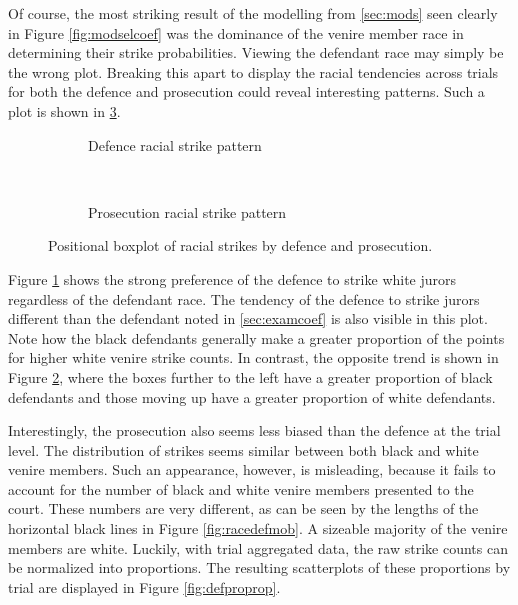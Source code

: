 Of course, the most striking result of the modelling from \ref{sec:mods} seen clearly in Figure \ref{fig:modselcoef} was the
dominance of the venire member race in determining their strike probabilities. Viewing the defendant race may simply be the wrong
plot. Breaking this apart to display the racial tendencies across trials for both the defence and prosecution could reveal
interesting patterns. Such a plot is shown in \ref{fig:defandpros}.

\begin{figure}[h!]
  \centering
  \begin{subfigure}{0.7\textwidth}
    \caption{\footnotesize Defence racial strike pattern}
    \label{fig:defracestrike}
  \end{subfigure}
  ~
  \begin{subfigure}{0.7\textwidth}
    \caption{\footnotesize Prosecution racial strike pattern}
    \label{fig:proracestrike}
  \end{subfigure}
  \caption[Racial Strike Pattern by Party]
  {\footnotesize Positional boxplot of racial strikes by defence and prosecution.}
  \label{fig:defandpros}
\end{figure}

Figure \ref{fig:defracestrike} shows the strong preference of the defence to strike white jurors regardless of the defendant
race. The tendency of the defence to strike jurors different than the defendant noted in \ref{sec:examcoef} is also visible in
this plot. Note how the black defendants generally make a greater proportion of the points for higher white venire strike
counts. In contrast, the opposite trend is shown in Figure \ref{fig:proracestrike}, where the boxes further to the left have a
greater proportion of black defendants and those moving up have a greater proportion of white defendants.

Interestingly, the prosecution also seems less biased than the defence at the trial level. The distribution of strikes seems
similar between both black and white venire members. Such an appearance, however, is misleading, because it fails to account for
the number of black and white venire members presented to the court. These numbers are very different, as can be seen by the
lengths of the horizontal black lines in Figure \ref{fig:racedefmob}. A sizeable majority of the venire members are
white. Luckily, with trial aggregated data, the raw strike counts can be normalized into proportions. The resulting scatterplots
of these proportions by trial are displayed in Figure \ref{fig:defproprop}.


